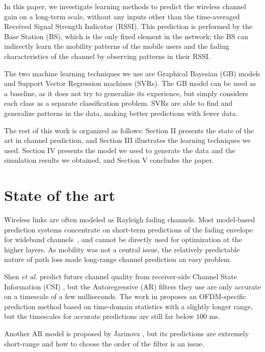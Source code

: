 \documentclass[conference, a4paper]{IEEEtran}
\begin{document}
In this paper, we investigate learning methods to predict the wireless channel gain on a long-term scale, without any inputs other than the time-averaged Received Signal Strength Indicator (RSSI). This prediction is performed by the Base Station (BS), which is the only fixed element in the network; the BS can indirectly learn the mobility patterns of the mobile users and the fading characteristics of the channel by observing patterns in their RSSI.

The two machine learning techniques we use are Graphical Bayesian (GB) models and Support Vector Regression machines (SVRs). The GB model can be used as a baseline, as it does not try to generalize its experience, but simply considers each class as a separate classification problem. SVRs are able to find and generalize patterns in the data, making better predictions with fewer data.

The rest of this work is organized as follows: Section II presents the state of the art in channel prediction, and Section III illustrates the learning techniques we used. Section IV presents the model we used to generate the data and the simulation results we obtained, and Section V concludes the paper.

\section{State of the art}

Wireless links are often modeled as Rayleigh fading channels. Most model-based prediction systems concentrate on short-term predictions of the fading envelope for wideband channels~\cite{dong2001prediction}, and cannot be directly used for optimization at the higher layers. As mobility was not a central issue, the relatively predictable nature of path loss made long-range channel prediction an easy problem.

Shen \emph{et al.} predict future channel quality from receiver-side Channel State Information (CSI) \cite{shen2003short}, but the Autoregressive (AR) filters they use are only accurate on a timescale of a few milliseconds. The work in \cite{wong2004long} proposes an OFDM-specific prediction method based on time-domain statistics with a slightly longer range, but the timescales for accurate predictions are still far below $100$ ms.

Another AR model is proposed by Jarinova \cite{jarinova2013autoregressive}, but its predictions are extremely short-range and how to choose the order of the filter is an issue.
\end{document}
